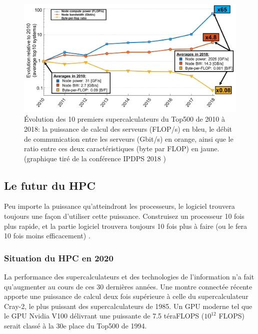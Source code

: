             \begin{figure}             \center             \includegraphics[width=12cm]{images/unbalance_flop_io.png}             \caption{\label{fig:unbalance_flop_io}Évolution des 10 premiers supercalculateurs du Top500 de 2010 à 2018: la puissance de calcul des serveurs (FLOP/s) en bleu, le débit de communication entre les serveurs (Gbit/s) en orange, ainsi que le ratio entre ces deux caractéristiques (byte par \gls{FLOP}) en jaune. (graphique tiré de la conférence IPDPS 2018 \cite{Bergman2018})}             \end{figure}
 
 
\subsection{Le futur du HPC}


    \begin{fancyquotes}
    Peu importe la puissance qu'atteindront les processeurs, le logiciel trouvera toujours une façon d'utiliser cette puissance. Construisez un processeur 10 fois plus rapide, et la partie logiciel trouvera toujours 10 fois plus à faire (ou le fera 10 fois moins efficacement)  \cite{Sutter2005a}.
    \end{fancyquotes}
 
    \subsubsection{Situation du HPC en 2020}

   
        
        La performance des supercalculateurs et des technologies de l'information n'a fait qu'augmenter au cours de ces 30 dernières années. Une montre connectée récente apporte une puissance de calcul deux fois supérieure à celle du supercalculateur Cray-2, le plus puissant des supercalculateurs de 1985. Un GPU moderne tel que le GPU Nvidia V100 délivrant une puissante de 7.5 téraFLOPS ($10^{12}$ \gls{FLOPS}) serait classé à la 30e place du Top500 de 1994.

